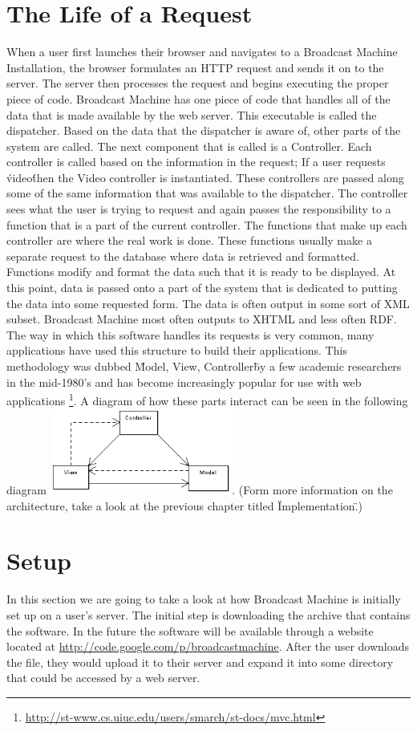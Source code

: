 \documentclass[a4paper,12pt]{report}
\begin{document}
\section{The Life of a Request}
When a user first launches their browser and navigates to a Broadcast Machine Installation, the browser formulates an HTTP request and sends it on to the server.
The server then processes the request and begins executing the proper piece of code.
Broadcast Machine has one piece of code that handles all of the data that is made available by the web server.
This executable is called the dispatcher.
Based on the data that the dispatcher is aware of, other parts of the system are called.
The next component that is called is a Controller.
Each controller is called based on the information in the request; If a user requests \'video\' then the Video controller is instantiated.
These controllers are passed along some of the same information that was available to the dispatcher.
The controller sees what the user is trying to request and again passes the responsibility to a function that is a part of the current controller.
The functions that make up each controller are where the real work is done.
These functions usually make a separate request to the database where data is retrieved and formatted.
Functions modify and format the data such that it is ready to be displayed.
At this point, data is passed onto a part of the system that is dedicated to putting the data into some requested form.
The data is often output in some sort of XML subset.
Broadcast Machine most often outputs to XHTML and less often RDF.
The way in which this software handles its requests is very common, many applications have used this structure to build their applications.
This methodology was dubbed \"Model, View, Controller\" by a few academic researchers in the mid-1980's and has become increasingly popular for use with web applications \footnote{\url{http://st-www.cs.uiuc.edu/users/smarch/st-docs/mvc.html}}.
A diagram of how these parts interact can be seen in the following diagram \includegraphics[width=60mm]{images/mvc.png}.
(Form more information on the architecture, take a look at the previous chapter titled \"Implementation\".)


\section{Setup}
In this section we are going to take a look at how Broadcast Machine is initially set up on a user's server.
The initial step is downloading the archive that contains the software.
In the future the software will be available through a website located at \url{http://code.google.com/p/broadcastmachine}.
After the user downloads the file, they would upload it to their server and expand it into some directory that could be accessed by a web server.
\end{document}

